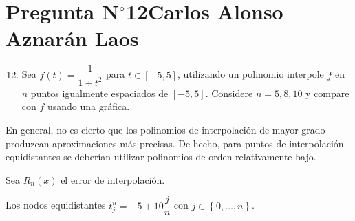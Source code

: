 \section{Pregunta N$^{\circ}$12\qquad Carlos Alonso Aznarán Laos}



\begin{frame}
    \begin{enumerate}\setcounter{enumi}{11}
        \item

              Sea
              \begin{math}
                  f\left(t\right)=
                  \dfrac{1}{1+t^{2}}
              \end{math}
              para $t\in\left[-5,5\right]$, utilizando un polinomio
              interpole $f$ en $n$ puntos igualmente espaciados de
              $\left[-5,5\right]$.
              Considere $n=5,8,10$ y compare con $f$ usando una
              gráfica.
    \end{enumerate}

    \begin{solution}
        En general, no es cierto que los polinomios de interpolación
        de mayor grado produzcan aproximaciones más precisas.
        De hecho, para puntos de interpolación equidistantes se
        deberían utilizar polinomios de orden relativamente bajo.

        Sea $R_{n}\left(x\right)$ el error de interpolación.

        Los nodos equidistantes
        \begin{math}
            t^{n}_{j}=
            -5+10\dfrac{j}{n}
        \end{math}
        con $j\in\left\{0,\dotsc,n\right\}$.
    \end{solution}
\end{frame}

